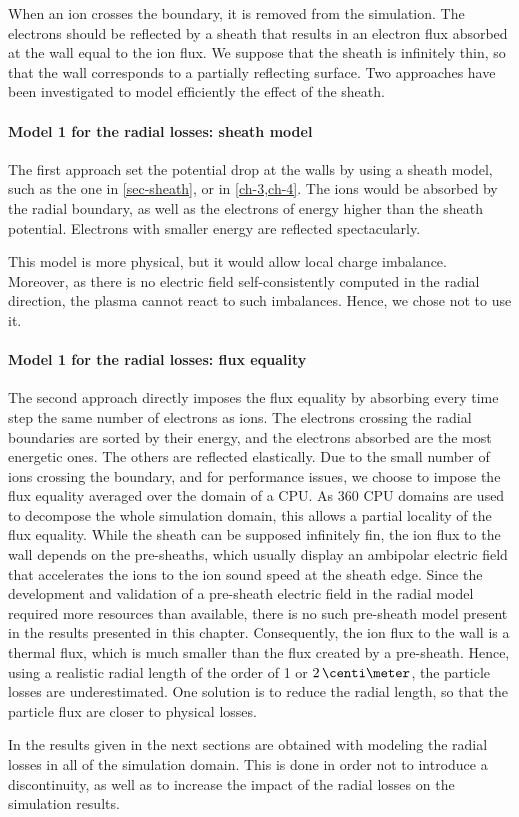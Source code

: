 When an ion crosses the boundary, it is removed from the simulation.
The electrons should be reflected by a sheath that results in an electron flux absorbed at the wall equal to the ion flux.
We suppose that the sheath is infinitely thin, so that the wall corresponds to a partially reflecting surface.
Two approaches have been investigated to model efficiently the effect of the sheath.


\paragraph{ Model 1 for the radial losses\string: sheath model\\}
The first approach set the potential drop at the walls by using  a sheath model, such as the one in \cref{sec-sheath}, or in \cref{ch-3,ch-4}.
The ions would be absorbed by the radial boundary, as well as the electrons of energy higher than the sheath potential.
Electrons with smaller energy are reflected spectacularly.

This model is more physical, but it would allow local charge imbalance.
Moreover, as there is no electric field self-consistently computed in the radial direction, the plasma cannot react to such imbalances.
Hence, we chose not to use it.

\paragraph{Model 1 for the  radial losses\string: flux equality\\}
The second approach directly imposes the flux equality by absorbing every time step the same number of electrons as ions.
The electrons crossing the radial boundaries are sorted by their energy, and the electrons absorbed are the most energetic ones.
The others are reflected elastically.
Due to the small number of ions crossing the boundary, and for performance issues, we choose to impose the flux equality averaged over the domain of a CPU.
As 360 CPU domains are used to decompose the whole simulation domain, this allows a partial locality of the flux equality. 
\vspace{1ex}
While the sheath can be supposed infinitely fin, the ion flux to the wall depends on the pre-sheaths, which usually display an ambipolar electric field that accelerates the ions to the ion sound speed at the sheath edge.
Since the development and validation of a pre-sheath electric field in the radial model required more resources than available, there is no such pre-sheath model present in the results presented in this chapter.
Consequently, the ion flux to the wall is a thermal flux, which is much smaller than the flux created by a pre-sheath.
Hence, using a realistic radial length  of the order of 1 or $2\,\centi\meter$, the particle losses are underestimated.
One solution is to reduce the radial length, so that the particle flux are closer to physical losses.

In the results given in the next sections are obtained with modeling the radial losses in all of the simulation domain.
This is done in order not to introduce a discontinuity, as well as to increase the impact of the radial losses on the simulation results.
